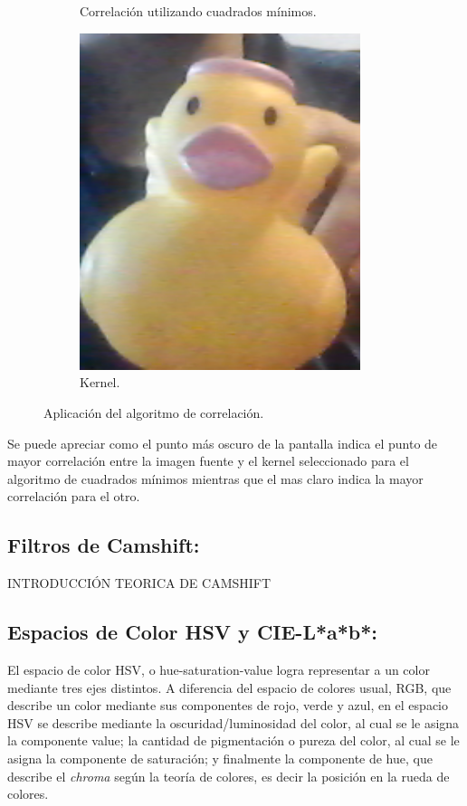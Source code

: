 \begin{figure}[H]
\begin{subfigure}{.4\textwidth}
		\caption{Correlación utilizando cuadrados mínimos.}
		\label{fig:sqdiff}
	\end{subfigure}
	\begin{subfigure}{.1\textwidth}
		\centering
		\includegraphics[width=0.9\textwidth]{Imagenes/kernel.png}
		\caption{Kernel.}
		\label{fig:kernel}
	\end{subfigure}
	\caption{Aplicación del algoritmo de correlación.}
	\label{fig:corrtest}
\end{figure}
Se puede apreciar como el punto más oscuro de la pantalla indica el punto de mayor correlación entre la imagen fuente y el kernel seleccionado para el algoritmo de cuadrados mínimos mientras que el mas claro indica la mayor correlación para el otro. 
\subsection{Filtros de Camshift:}
\begin{Huge}
INTRODUCCIÓN TEORICA DE CAMSHIFT
\end{Huge}
\subsection{Espacios de Color HSV y CIE-L*a*b*:}
El espacio de color HSV, o hue-saturation-value logra representar a un color mediante tres ejes distintos. A diferencia del espacio de colores usual, RGB, que describe un color mediante sus componentes de rojo, verde y azul, en el espacio HSV se describe mediante la oscuridad/luminosidad del color, al cual se le asigna la componente value; la cantidad de pigmentación o pureza del color, al cual se le asigna la componente de saturación; y finalmente la componente de hue, que describe el \textit{chroma} según la teoría de colores, es decir la posición en la rueda de colores.

